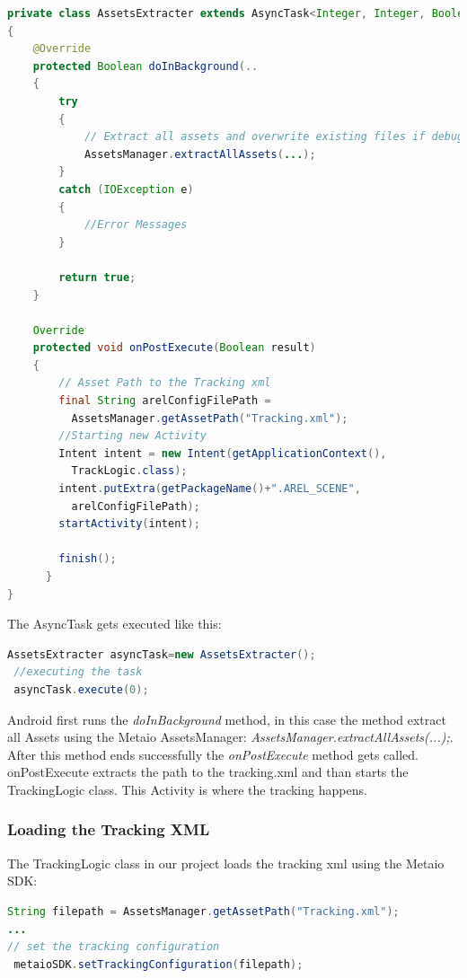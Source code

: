 \begin{lstlisting}[language=java, caption=Extracting Assets]
private class AssetsExtracter extends AsyncTask<Integer, Integer, Boolean>
{		
	@Override
	protected Boolean doInBackground(.. 
	{
		try 
		{
			// Extract all assets and overwrite existing files if debug build
			AssetsManager.extractAllAssets(...);
		} 
		catch (IOException e) 
		{
			//Error Messages
		}
			
		return true;
	}
		
	Override
	protected void onPostExecute(Boolean result) 
	{
		// Asset Path to the Tracking xml
		final String arelConfigFilePath = 
		  AssetsManager.getAssetPath("Tracking.xml");
		//Starting new Activity  
		Intent intent = new Intent(getApplicationContext(), 
		  TrackLogic.class);
		intent.putExtra(getPackageName()+".AREL_SCENE", 
		  arelConfigFilePath);
		startActivity(intent);

		finish();
	  }
}
\end{lstlisting}
The AsyncTask gets executed like this:

\begin{lstlisting}[language=java, caption=executing AsyncTask]
 AssetsExtracter asyncTask=new AssetsExtracter();
 //executing the task
 asyncTask.execute(0);
\end{lstlisting}





Android first runs the \textit{doInBackground} method, in this case the method extract all Assets using the Metaio 	AssetsManager: 	\textit{AssetsManager.extractAllAssets(...);}. After this method ends successfully the \textit{onPostExecute} method gets called.
\\


onPostExecute extracts the path to the tracking.xml and than starts the TrackingLogic class. This Activity is where the tracking happens.

\subsubsection{Loading the Tracking XML}
The TrackingLogic class in our project loads the tracking xml using the Metaio SDK:
\begin{lstlisting}[language=java, caption=executing AsyncTask]
String filepath = AssetsManager.getAssetPath("Tracking.xml");
...
// set the tracking configuration
 metaioSDK.setTrackingConfiguration(filepath); 
\end{lstlisting}

